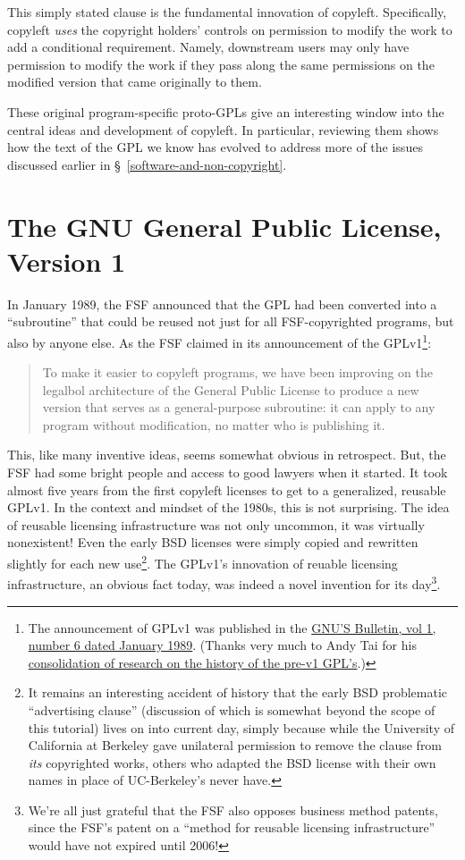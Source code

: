 This simply stated clause is the fundamental innovation of copyleft.
Specifically, copyleft \textit{uses} the copyright holders' controls on
permission to modify the work to add a conditional requirement.  Namely,
downstream users may only have permission to modify  the work if they pass
along the same permissions on the modified version that came originally to
them.

These original program-specific proto-GPLs give an interesting window into
the central ideas and development of copyleft.  In particular, reviewing them
shows how the text of the GPL we know has evolved to address more of the
issues discussed earlier in \S~\ref{software-and-non-copyright}.

\section{The GNU General Public License, Version 1}

In January 1989, the FSF announced that the GPL had been converted into a
``subroutine'' that could be reused not just for all FSF-copyrighted
programs, but also by anyone else.  As the FSF claimed in its announcement of
the GPLv1\footnote{The announcement of GPLv1 was published in the
  \href{http://www.gnu.org/bulletins/bull6.html\#SEC8}{GNU'S Bulletin, vol 1,
    number 6 dated January 1989}.  (Thanks very much to Andy Tai for his
  \href{http://www.free-soft.org/gpl_history/}{consolidation of research on
    the history of the pre-v1 GPL's}.)}:
\begin{quotation}
To make it easier to copyleft programs, we have been improving on the
legalbol architecture of the General Public License to produce a new version
that serves as a general-purpose subroutine: it can apply to any program
without modification, no matter who is publishing it.
\end{quotation}

This, like many inventive ideas, seems somewhat obvious in retrospect.  But,
the FSF had some bright people and access to good lawyers when it started.
It took almost five years from the first copyleft licenses to get to a
generalized, reusable GPLv1.  In the context and mindset of the 1980s, this
is not surprising.  The idea of reusable licensing infrastructure was not
only uncommon, it was virtually nonexistent!  Even the early BSD licenses
were simply copied and rewritten slightly for each new use\footnote{It
  remains an interesting accident of history that the early BSD problematic
  ``advertising clause'' (discussion of which is somewhat beyond the scope of
  this tutorial) lives on into current day, simply because while the
  University of California at Berkeley gave unilateral permission to remove
  the clause from \textit{its} copyrighted works, others who adapted the BSD
  license with their own names in place of UC-Berkeley's never have.}.  The
GPLv1's innovation of reuable licensing infrastructure, an obvious fact
today, was indeed a novel invention for its day\footnote{We're all just
  grateful that the FSF also opposes business method patents, since the FSF's
  patent on a ``method for reusable licensing infrastructure'' would have
  not expired until 2006!}.

